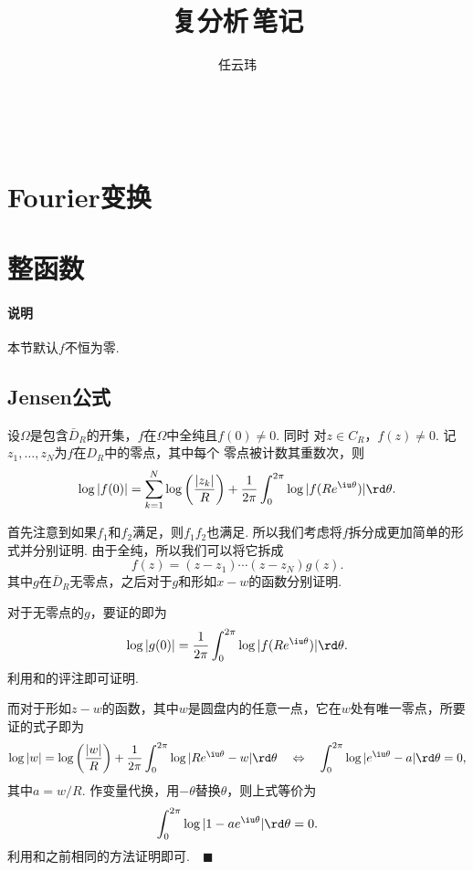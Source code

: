 

\title{复分析$\,$笔记}
\author{任云玮}
\date{}



\maketitle
\tableofcontents

\newpage

 
\newpage


\newpage


\newpage
\section{Fourier变换}

\newpage
\section{整函数}
  \paragraph{说明}
    本节默认$f$不恒为零.

\subsection{Jensen公式}

  \begin{thm}[Jensen]
    \label{thm: Jensen}
    设$\Omega$是包含$\bar{D}_R$的开集，$f$在$\Omega$中全纯且$f(0)\ne 0$. 同时
    对$z\in C_R$，$f(z)\ne 0$. 记$z_1,\dots,z_N$为$f$在$D_R$中的零点，其中每个
    零点被计数其重数次，则
    \begin{equation}
      \label{equ: Jensen}
      \log|f(0)| = \sum_{k=1}^N\log\left( \frac{|z_k|}{R} \right)
      + \frac{1}{2\pi}\int_0^{2\pi}\log|f(Re^{\iu\theta})|\rd\theta.
    \end{equation}
  \end{thm}
  \remark
  \proof
    首先注意到如果$f_1$和$f_2$满足，则$f_1f_2$也满足.
    所以我们考虑将$f$拆分成更加简单的形式并分别证明. 由于全纯，所以我们可以将它拆成
    \[
      f(z) = (z-z_1)\cdots (z-z_N)g(z).
    \]
    其中$g$在$\bar{D}_R$无零点，之后对于$g$和形如$x-w$的函数分别证明.\par
    对于无零点的$g$，要证的即为
    \[
      \log|g(0)| = \frac{1}{2\pi}\int_0^{2\pi}\log|f(Re^{\iu\theta})|\rd\theta.
    \]
    利用和的评注即可证明.\par
    而对于形如$z-w$的函数，其中$w$是圆盘内的任意一点，它在$w$处有唯一零点，所要证的式子即为
    \[
      \log|w|=\log\left( \frac{|w|}{R} \right) + \frac{1}{2\pi}\int_0^{2\pi}
      \log|Re^{\iu\theta} - w|\rd\theta \quad\Leftrightarrow\quad
      \int_0^{2\pi}\log|e^{\iu\theta}-a|\rd\theta = 0,
    \]
    其中$a=w/R$. 作变量代换，用$-\theta$替换$\theta$，则上式等价为
    \[
      \int_0^{2\pi}\log|1-ae^{\iu\theta}|\rd\theta = 0.
    \]
    利用和之前相同的方法证明即可.$\quad\blacksquare$

